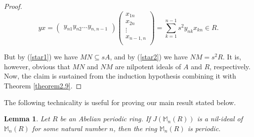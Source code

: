 \documentclass[12pt]{amsart}
\newtheorem{lem}[thm]{Lemma}
\theoremstyle{definition}
\theoremstyle{remark}
\numberwithin{equation}{section}
\begin{document}
\begin{proof}
\begin{equation} \label{star2}
yx=\begin{pmatrix}
y_{n1} y_{n2} \ldots y_{n,n-1}
\end{pmatrix} \begin{pmatrix}
 x_{1n} \\ x_{2n} \\ \vdots \\ x_{n-1,n} \\
\end{pmatrix}=\sum_{k=1}^{n-1} s^2y_{nk}x_{kn} \in R.
\end{equation}

But by (\ref{star1}) we have $MN \subseteq sA$, and by (\ref{star2}) we have $NM=s^2R$. It is, however, obvious that $MN$ and $NM$ are nilpotent ideals of $A$ and $R$, respectively. Now, the claim is sustained from the induction hypothesis combining it with Theorem \ref{theorem2.9}.
\end{proof}

The following technicality is useful for proving our main result stated below.

\begin{lem}\label{lemma2.1} 
Let $R$ be an Abelian periodic ring. If $J(\mathbb{M}_n(R))$ is a nil-ideal of $\mathbb{M}_n(R)$ for some natural number $n$, then the ring $\mathbb{M}_n(R)$ is periodic.
\end{lem}
\end{document}

